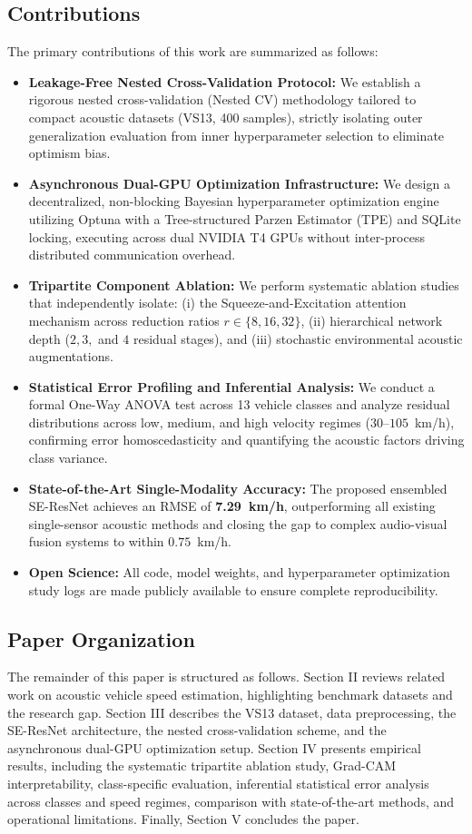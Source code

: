 \documentclass[conference]{IEEEtran}
\begin{document}
\subsection{Contributions}
The primary contributions of this work are summarized as follows:
\begin{itemize}
    \item \textbf{Leakage-Free Nested Cross-Validation Protocol:} We establish a rigorous nested cross-validation (Nested CV) methodology tailored to compact acoustic datasets (VS13, 400 samples), strictly isolating outer generalization evaluation from inner hyperparameter selection to eliminate optimism bias.
    \item \textbf{Asynchronous Dual-GPU Optimization Infrastructure:} We design a decentralized, non-blocking Bayesian hyperparameter optimization engine utilizing Optuna \cite{ref11} with a Tree-structured Parzen Estimator (TPE) and SQLite locking, executing across dual NVIDIA T4 GPUs without inter-process distributed communication overhead.
    \item \textbf{Tripartite Component Ablation:} We perform systematic ablation studies that independently isolate: (i) the Squeeze-and-Excitation attention mechanism across reduction ratios $r \in \{8, 16, 32\}$, (ii) hierarchical network depth ($2, 3,$ and $4$ residual stages), and (iii) stochastic environmental acoustic augmentations.
    \item \textbf{Statistical Error Profiling and Inferential Analysis:} We conduct a formal One-Way ANOVA test across 13 vehicle classes and analyze residual distributions across low, medium, and high velocity regimes ($30\text{--}105$~km/h), confirming error homoscedasticity and quantifying the acoustic factors driving class variance.
    \item \textbf{State-of-the-Art Single-Modality Accuracy:} The proposed ensembled SE-ResNet achieves an RMSE of \textbf{7.29~km/h}, outperforming all existing single-sensor acoustic methods and closing the gap to complex audio-visual fusion systems to within $0.75$~km/h.
    \item \textbf{Open Science:} All code, model weights, and hyperparameter optimization study logs are made publicly available to ensure complete reproducibility.
\end{itemize}

\subsection{Paper Organization}
The remainder of this paper is structured as follows. Section II reviews related work on acoustic vehicle speed estimation, highlighting benchmark datasets and the research gap. Section III describes the VS13 dataset, data preprocessing, the SE-ResNet architecture, the nested cross-validation scheme, and the asynchronous dual-GPU optimization setup. Section IV presents empirical results, including the systematic tripartite ablation study, Grad-CAM interpretability, class-specific evaluation, inferential statistical error analysis across classes and speed regimes, comparison with state-of-the-art methods, and operational limitations. Finally, Section V concludes the paper.
\end{document}
